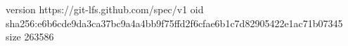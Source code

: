 version https://git-lfs.github.com/spec/v1
oid sha256:e6b6cde9da3ca37bc9a4a4bb9f75ffd2f6cfae6b1c7d82905422e1ac71b07345
size 263586
